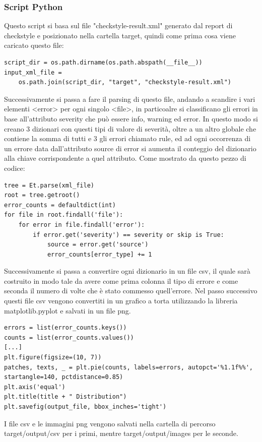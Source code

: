 \subsubsection{Script Python}
Questo script si basa sul file "checkstyle-result.xml" generato dal report di checkstyle e posizionato nella cartella target, quindi come prima cosa viene caricato questo file:
\begin{lstlisting}[style=pythonstyle, caption={Script Python - aggiunta checkstyle-result.xml}, label=lst:python-checkstyle-result]
script_dir = os.path.dirname(os.path.abspath(__file__))
input_xml_file = 
	os.path.join(script_dir, "target", "checkstyle-result.xml")
\end{lstlisting}
Successivamente si passa a fare il parsing di questo file, andando a scandire i vari elementi <error> per ogni singolo <file>, in particoalre si classificano gli errori in base all'attributo severity che può essere info, warning ed error. In questo modo si creano 3 dizionari con questi tipi di valore di severità, oltre a un altro globale che contiene la somma di tutti e 3 gli errori chiamato rule, ed ad ogni occorrenza di un errore data dall'attributo source di error si aumenta il conteggio del dizionario alla chiave corrispondente a quel attributo. Come mostrato da questo pezzo di codice:
\begin{lstlisting}[style=pythonstyle, caption={Script Python - parsing checkstyle-result.xml}, label=lst:python-parsing]
tree = Et.parse(xml_file)
root = tree.getroot()
error_counts = defaultdict(int)
for file in root.findall('file'):
	for error in file.findall('error'):
		if error.get('severity') == severity or skip is True:
			source = error.get('source')
			error_counts[error_type] += 1
\end{lstlisting}
Successivamente si passa a convertire ogni dizionario in un file csv, il quale sarà costruito in modo tale da avere come prima colonna il tipo di errore e come seconda il numero di volte che è stato commesso quell'errore.
Nel passo successivo questi file csv vengono convertiti in un grafico a torta utilizzando la libreria matplotlib.pyplot e salvati in un file png.
\begin{lstlisting}[style=pythonstyle, caption={Script Python - Plot pie chart}, label=lst:python-piechart]
errors = list(error_counts.keys())
counts = list(error_counts.values())
[...]
plt.figure(figsize=(10, 7))
patches, texts, _ = plt.pie(counts, labels=errors, autopct='%1.1f%%', startangle=140, pctdistance=0.85)
plt.axis('equal')
plt.title(title + " Distribution")
plt.savefig(output_file, bbox_inches='tight')
\end{lstlisting}
I file csv e le immagini png vengono salvati nella cartella di percorso target/output/csv per i primi, mentre target/output/images per le seconde.
